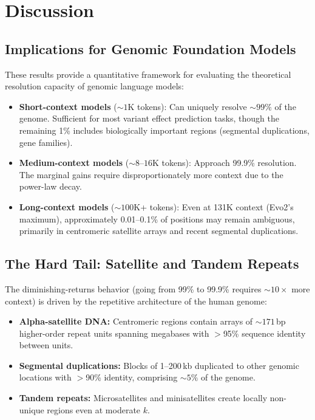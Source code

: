 \documentclass[11pt,a4paper]{article}
\begin{document}
\section{Discussion}

\subsection{Implications for Genomic Foundation Models}

These results provide a quantitative framework for evaluating the theoretical resolution capacity of genomic language models:

\begin{itemize}
    \item \textbf{Short-context models} (${\sim}1$K tokens): Can uniquely resolve ${\sim}99\%$ of the genome. Sufficient for most variant effect prediction tasks, though the remaining 1\% includes biologically important regions (segmental duplications, gene families).

    \item \textbf{Medium-context models} (${\sim}8$--$16$K tokens): Approach 99.9\% resolution. The marginal gains require disproportionately more context due to the power-law decay.

    \item \textbf{Long-context models} (${\sim}100$K+ tokens): Even at 131K context (Evo2's maximum), approximately 0.01--0.1\% of positions may remain ambiguous, primarily in centromeric satellite arrays and recent segmental duplications.
\end{itemize}

\subsection{The Hard Tail: Satellite and Tandem Repeats}

The diminishing-returns behavior (going from 99\% to 99.9\% requires ${\sim}10\times$ more context) is driven by the repetitive architecture of the human genome:

\begin{itemize}
    \item \textbf{Alpha-satellite DNA:} Centromeric regions contain arrays of ${\sim}171$\,bp higher-order repeat units spanning megabases with $>$95\% sequence identity between units.
    \item \textbf{Segmental duplications:} Blocks of 1--200\,kb duplicated to other genomic locations with $>$90\% identity, comprising ${\sim}5\%$ of the genome.
    \item \textbf{Tandem repeats:} Microsatellites and minisatellites create locally non-unique regions even at moderate $k$.
\end{itemize}
\end{document}
